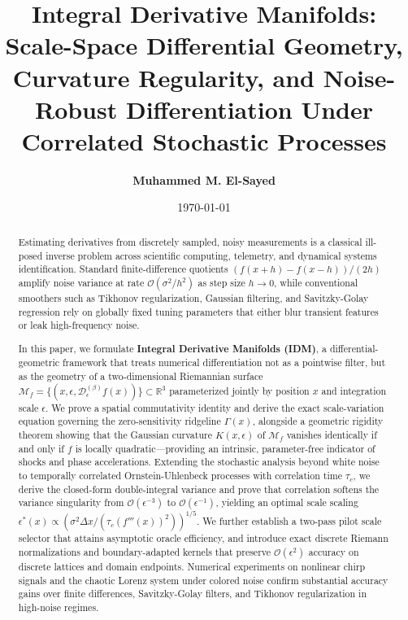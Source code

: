 \documentclass[11pt,a4paper]{article}
\title{\textbf{Integral Derivative Manifolds: Scale-Space Differential Geometry, Curvature Regularity, and Noise-Robust Differentiation Under Correlated Stochastic Processes}}
\author{
  \textbf{Muhammed M. El-Sayed}
}
\date{\today}
\theoremstyle{definition}
\begin{document}
\maketitle

\begin{abstract}
Estimating derivatives from discretely sampled, noisy measurements is a classical ill-posed inverse problem across scientific computing, telemetry, and dynamical systems identification. Standard finite-difference quotients $(f(x+h)-f(x-h))/(2h)$ amplify noise variance at rate $\mathcal{O}(\sigma^2 / h^2)$ as step size $h \to 0$, while conventional smoothers such as Tikhonov regularization, Gaussian filtering, and Savitzky-Golay regression rely on globally fixed tuning parameters that either blur transient features or leak high-frequency noise.

In this paper, we formulate \textbf{Integral Derivative Manifolds (IDM)}, a differential-geometric framework that treats numerical differentiation not as a pointwise filter, but as the geometry of a two-dimensional Riemannian surface $\mathcal{M}_f = \{(x, \epsilon, \mathcal{D}_\epsilon^{(\beta)} f(x))\} \subset \mathbb{R}^3$ parameterized jointly by position $x$ and integration scale $\epsilon$. We prove a spatial commutativity identity and derive the exact scale-variation equation governing the zero-sensitivity ridgeline $\Gamma(x)$, alongside a geometric rigidity theorem showing that the Gaussian curvature $K(x, \epsilon)$ of $\mathcal{M}_f$ vanishes identically if and only if $f$ is locally quadratic---providing an intrinsic, parameter-free indicator of shocks and phase accelerations. Extending the stochastic analysis beyond white noise to temporally correlated Ornstein-Uhlenbeck processes with correlation time $\tau_c$, we derive the closed-form double-integral variance and prove that correlation softens the variance singularity from $\mathcal{O}(\epsilon^{-3})$ to $\mathcal{O}(\epsilon^{-1})$, yielding an optimal scale scaling $\epsilon^*(x) \propto (\sigma^2 \Delta x / (\tau_c (f'''(x))^2))^{1/5}$. We further establish a two-pass pilot scale selector that attains asymptotic oracle efficiency, and introduce exact discrete Riemann normalizations and boundary-adapted kernels that preserve $\mathcal{O}(\epsilon^2)$ accuracy on discrete lattices and domain endpoints. Numerical experiments on nonlinear chirp signals and the chaotic Lorenz system under colored noise confirm substantial accuracy gains over finite differences, Savitzky-Golay filters, and Tikhonov regularization in high-noise regimes.
\end{abstract}
\end{document}
